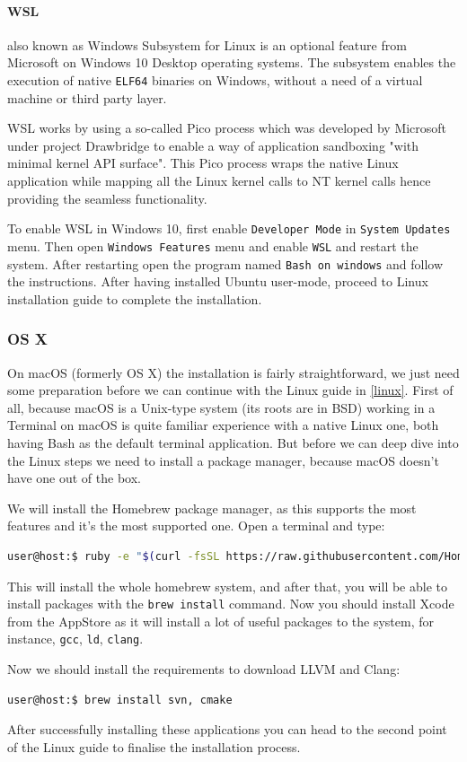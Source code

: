 \paragraph{WSL}
\par also known as Windows Subsystem for Linux is an optional feature from Microsoft on Windows 10 Desktop operating systems. The subsystem enables the execution of native \verb|ELF64| binaries\cite{wsl_overview} on Windows, without a need of a virtual machine or third party layer. \medskip
\par WSL works by using a so-called Pico process which was developed by Microsoft under project Drawbridge\cite{project_drawbridge} to enable a way of application sandboxing "with minimal kernel API surface"\cite{project_drawbridge}. This Pico process wraps the native Linux application while mapping all the Linux kernel calls to NT kernel calls hence providing the seamless functionality. \medskip
\par To enable WSL in Windows 10, first enable \verb|Developer Mode| in \verb|System Updates| menu. Then open \verb|Windows Features| menu and enable \verb|WSL| and restart the system. After restarting open the program named \verb|Bash on windows| and follow the instructions. After having installed Ubuntu user-mode, proceed to Linux installation guide to complete the installation.
\subsubsection{OS X}
\par On macOS (formerly OS X) the installation is fairly straightforward, we just need some preparation before we can continue with the Linux guide in \ref{linux}. First of all, because macOS is a Unix-type system (its roots are in BSD) working in a Terminal on macOS is quite familiar experience with a native Linux one, both having Bash as the default terminal application. But before we can deep dive into the Linux steps we need to install a package manager, because macOS doesn't have one out of the box.
\par We will install the Homebrew\cite{homebrew_homepage} package manager, as this supports the most features and it's the most supported one. Open a terminal and type:
\begin{lstlisting}[language=bash, frame=single]
user@host:$ ruby -e "$(curl -fsSL https://raw.githubusercontent.com/Homebrew/install/master/install)"
\end{lstlisting}
\par This will install the whole homebrew system, and after that, you will be able to install packages with the \verb|brew install| command. Now you should install Xcode from the AppStore as it will install a lot of useful packages to the system, for instance, \verb|gcc|, \verb|ld|, \verb|clang|.
\par Now we should install the requirements to download LLVM and Clang:
\begin{lstlisting}[language=bash, frame=single]
user@host:$ brew install svn, cmake
\end{lstlisting}
\par After successfully installing these applications you can head to the second point of the Linux guide to finalise the installation process.
